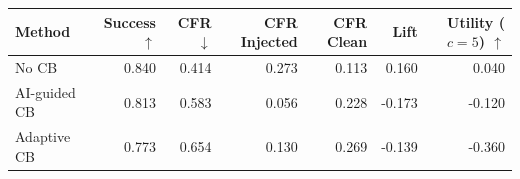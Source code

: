 \begin{tabular}{lrrrrrr}
\toprule
Method & Success $\uparrow$ & CFR $\downarrow$ & CFR Injected & CFR Clean & Lift & Utility ($c=5$) $\uparrow$ \\
\midrule
No CB & 0.840 & 0.414 & 0.273 & 0.113 & 0.160 & 0.040 \\
AI-guided CB & 0.813 & 0.583 & 0.056 & 0.228 & -0.173 & -0.120 \\
Adaptive CB & 0.773 & 0.654 & 0.130 & 0.269 & -0.139 & -0.360 \\
\bottomrule
\end{tabular}
